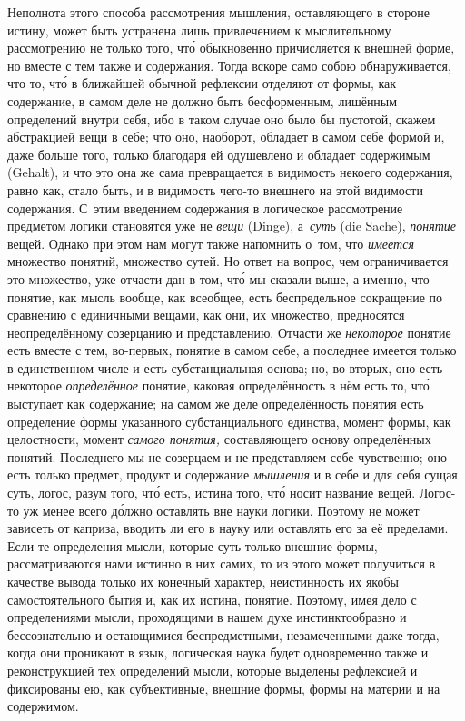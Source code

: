 Неполнота этого способа рассмотрения мышления, оставляющего в стороне истину,
может быть устранена лишь привлечением к мыслительному рассмотрению не только
того, чт\'{о} обыкновенно причисляется к внешней форме, но вместе с тем также и
содержания. Тогда вскоре само собою обнаруживается, что то, чт\'{о} в ближайшей
обычной рефлексии отделяют от формы, как содержание, в самом деле не должно
быть бесформенным, лишённым определений внутри себя, ибо в таком случае оно
было бы пустотой, скажем абстракцией вещи в себе; что оно, наоборот, обладает в
самом себе формой и, даже больше того, только благодаря ей одушевлено и
обладает содержимым (Gehalt), и что это она же сама превращается в видимость
некоего содержания, равно как, стало быть, и в видимость чего-то внешнего на
этой видимости содержания. С~этим введением содержания в логическое
рассмотрение предметом логики становятся уже не {\em вещи} (Dinge),
а~{\em суть} (die Sache), {\em понятие} вещей. Однако при этом нам могут также
напомнить о~том, что {\em имеется} множество понятий, множество сутей. Но ответ
на вопрос, чем ограничивается это множество, уже отчасти дан в том, чт\'{о} мы
сказали выше, а именно, что понятие, как мысль вообще, как всеобщее, есть
беспредельное сокращение по сравнению с единичными вещами, как они, их
множество, предносятся неопределённому созерцанию и представлению. Отчасти же
{\em некоторое} понятие есть вместе с тем, во-первых, понятие в самом себе, а
последнее имеется только в единственном числе и есть субстанциальная основа;
но, во-вторых, оно есть некоторое {\em определённое} понятие, каковая
определённость в нём есть то, чт\'{о} выступает как содержание; на самом же
деле определённость понятия есть определение формы указанного субстанциального
единства, момент формы, как целостности, момент {\em самого понятия,}
составляющего основу определённых понятий. Последнего мы не созерцаем и не
представляем себе чувственно; оно есть только предмет, продукт и содержание
{\em мышления} и в себе и для себя сущая суть, логос, разум того, чт\'{о} есть,
истина того, чт\'{о} носит название вещей. Логос-то уж менее всего д\'{о}лжно
оставлять вне науки логики. Поэтому не может зависеть от каприза, вводить ли
его в науку или оставлять его за её пределами. Если те определения мысли,
которые суть только внешние формы, рассматриваются нами истинно в них самих, то
из этого может получиться в качестве вывода только их конечный характер,
неистинность их якобы самостоятельного бытия и, как их истина, понятие.
Поэтому, имея дело с определениями мысли, проходящими в нашем духе
инстинктообразно и бессознательно и остающимися беспредметными, незамеченными
даже тогда, когда они проникают в язык, логическая наука будет одновременно
также и реконструкцией тех определений мысли, которые выделены рефлексией и
фиксированы ею, как субъективные, внешние формы, формы на материи и на
содержимом.

